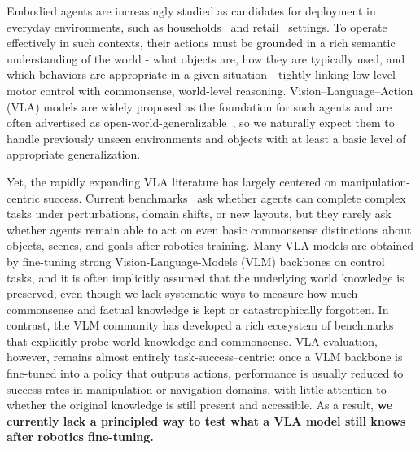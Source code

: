 \documentclass[11pt]{article}
\begin{document}
Embodied agents are increasingly studied as candidates for deployment in everyday environments, such as households~\cite{shukla2024maniskill, calvin, libero} and retail~\cite{soshin2025robobenchmart, liu2025fetchbot} settings. 
To operate effectively in such contexts, their actions must be grounded in a rich semantic understanding of the world - what objects are, how they are typically used, and which behaviors are appropriate in a given situation - tightly linking low-level motor control with commonsense, world-level reasoning.
Vision--Language--Action (VLA) models are widely proposed as the foundation for such agents and are often advertised as open-world-generalizable~\cite{pi0, openvla, magma, spatialvla, patratskiy2025spatial}, so we naturally expect them to handle previously unseen environments and objects with at least a basic level of appropriate generalization.

Yet, the rapidly expanding VLA literature has largely centered on manipulation-centric success.
Current benchmarks~\cite{libero, calvin, shukla2024maniskill, soshin2025robobenchmart, behavior1k, vlabench} ask whether agents can complete complex tasks under perturbations, domain shifts, or new layouts, but they rarely ask whether agents remain able to act on even basic commonsense distinctions about objects, scenes, and goals after robotics training.
Many VLA models are obtained by fine-tuning strong Vision-Language-Models (VLM) backbones on control tasks, and it is often implicitly assumed that the underlying world knowledge is preserved, even though we lack systematic ways to measure how much commonsense and factual knowledge is kept or catastrophically forgotten. In contrast, the VLM community has developed a rich ecosystem of benchmarks that explicitly probe world knowledge and commonsense. VLA evaluation, however, remains almost entirely task-success--centric: once a VLM backbone is fine-tuned into a policy that outputs actions, performance is usually reduced to success rates in manipulation or navigation domains, with little attention to whether the original knowledge is still present and accessible.
As a result, \textbf{we currently lack a principled way to test what a VLA model still knows after robotics fine-tuning.}
\end{document}
